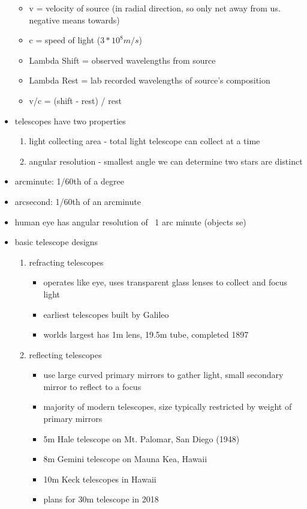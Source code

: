 \documentclass[12pt]{article}
\begin{document}
\begin{itemize}
\begin{itemize}
\item v = velocity of source (in radial direction, so only net away from us. negative means towards)
\item c = speed of light ($3*10^8 m/s$)
\item Lambda Shift = observed wavelengths from source
\item Lambda Rest = lab recorded wavelengths of source's composition
\item v/c = (shift - rest) / rest
\end{itemize}
\item telescopes have two properties
\begin{enumerate}
\item light collecting area - total light telescope can collect at a time
\item angular resolution - smallest angle we can determine two stars are distinct
\end{enumerate}
\item arcminute: 1/60th of a degree
\item arcsecond: 1/60th of an arcminute
\item human eye has angular resolution of ~1 arc minute (objects se)
\item basic telescope designs
\begin{enumerate}
\item refracting telescopes
\begin{itemize}
\item operates like eye, uses transparent glass lenses to collect and focus light
\item earliest telescopes built by Galileo
\item worlds largest has 1m lens, 19.5m tube, completed 1897
\end{itemize}
\item reflecting telescopes
\begin{itemize}
\item use large curved primary mirrors to gather light, small secondary mirror to reflect to a focus
\item majority of modern telescopes, size typically restricted by weight of primary mirrors
\item 5m Hale telescope on Mt. Palomar, San Diego (1948)
\item 8m Gemini telescope on Mauna Kea, Hawaii
\item 10m Keck telescopes in Hawaii
\item plans for 30m telescope in 2018
\end{itemize}
\end{enumerate}
\end{itemize}
\end{document}
